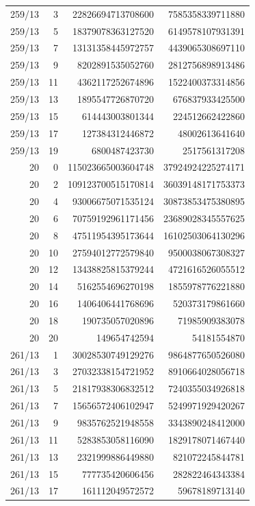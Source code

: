 \begin{longtable}{@{}rrrr@{}}
259/13 & 3 & 22826694713708600 & 7585358339711880\\
259/13 & 5 & 18379078363127520 & 6149578107931391\\
259/13 & 7 & 13131358445972757 & 4439065308697110\\
259/13 & 9 & 8202891535052760 & 2812756898913486\\
259/13 & 11 & 4362117252674896 & 1522400373314856\\
259/13 & 13 & 1895547726870720 & 676837933425500\\
259/13 & 15 & 614443003801344 & 224512662422860\\
259/13 & 17 & 127384312446872 & 48002613641640\\
259/13 & 19 & 6800487423730 & 2517561317208\\
20 & 0 & 115023665003604748 & 37924924225274171\\
20 & 2 & 109123700515170814 & 36039148171753373\\
20 & 4 & 93006675071535124 & 30873853475380895\\
20 & 6 & 70759192961171456 & 23689028345557625\\
20 & 8 & 47511954395173644 & 16102503064130296\\
20 & 10 & 27594012772579840 & 9500038067308327\\
20 & 12 & 13438825815379244 & 4721616526055512\\
20 & 14 & 5162554696270198 & 1855978776221880\\
20 & 16 & 1406406441768696 & 520373179861660\\
20 & 18 & 190735057020896 & 71985909383078\\
20 & 20 & 149654742594 & 54181554870\\
261/13 & 1 & 30028530749129276 & 9864877650526080\\
261/13 & 3 & 27032338154721952 & 8910664028056718\\
261/13 & 5 & 21817938306832512 & 7240355034926818\\
261/13 & 7 & 15656572406102947 & 5249971929420267\\
261/13 & 9 & 9835762521948558 & 3343890248412000\\
261/13 & 11 & 5283853058116090 & 1829178071467440\\
261/13 & 13 & 2321999886449880 & 821072245844781\\
261/13 & 15 & 777735420606456 & 282822464343384\\
261/13 & 17 & 161112049572572 & 59678189713140\\

\end{longtable}
